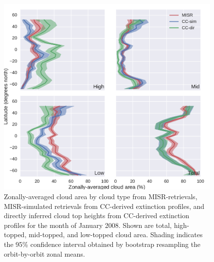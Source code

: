 \begin{figure}[htbp]
\centering
\includegraphics{graphics/misr_cldmisr_zonal_2008-01.pdf}
\caption{\label{fig:misr_cldmisr_zonal_jan}Zonally-averaged cloud area
by cloud type from MISR-retrievals, MISR-simulated retrievals from
CC-derived extinction profiles, and directly inferred cloud top heights
from CC-derived extinction profiles for the month of January 2008. Shown
are total, high-topped, mid-topped, and low-topped cloud area. Shading
indicates the 95\% confidence interval obtained by bootstrap resampling
the orbit-by-orbit zonal
means.}\label{fig:misrux5fcldmisrux5fzonalux5fjan}
\end{figure}

